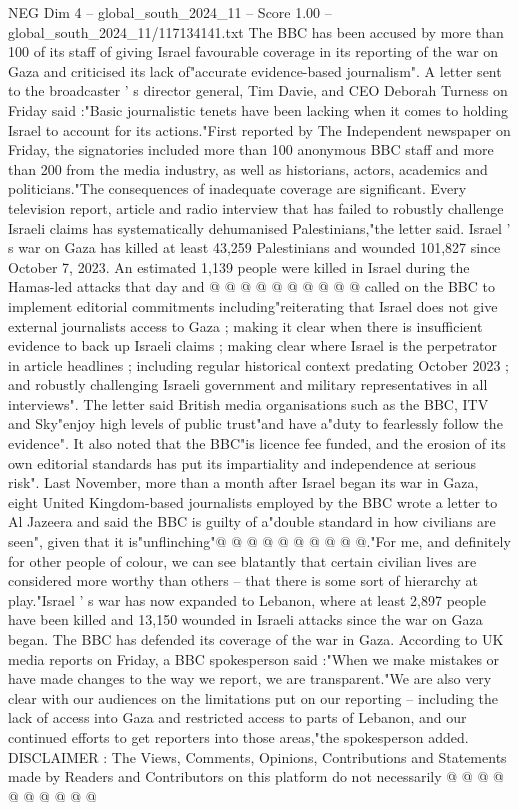 \begin{textsample}{NEG Dim 4 – global\_south\_2024\_11 – Score 1.00 – global\_south\_2024\_11/117134141.txt}  \label{ex:f4_neg_205}
The BBC has been accused by more than 100 of its staff of giving Israel favourable coverage in its reporting of the war on Gaza and criticised its lack of"accurate evidence-based journalism".
A letter sent to the broadcaster ' s director general, Tim Davie, and CEO Deborah Turness on Friday said :"Basic journalistic tenets have been lacking when it comes to holding Israel to account for its actions."First reported by The Independent newspaper on Friday, the signatories included more than 100 anonymous BBC staff and more than 200 from the media industry, as well as historians, actors, academics and politicians."The consequences of inadequate coverage are significant.
Every television report, article and radio interview that has failed to robustly challenge Israeli claims has systematically dehumanised Palestinians,"the letter said.
Israel ' s war on Gaza has killed at least 43,259 Palestinians and wounded 101,827 since October 7, 2023.
An estimated 1,139 people were killed in Israel during the Hamas-led attacks that day and @ @ @ @ @ @ @ @ @ @ called on the BBC to implement editorial commitments including"reiterating that Israel does not give external journalists access to Gaza ; making it clear when there is insufficient evidence to back up Israeli claims ; making clear where Israel is the perpetrator in article headlines ; including regular historical context predating October 2023 ; and robustly challenging Israeli government and military representatives in all interviews".
The letter said British media organisations such as the BBC, ITV and Sky"enjoy high levels of public trust"and have a"duty to fearlessly follow the evidence".
It also noted that the BBC"is licence fee funded, and the erosion of its own editorial standards has put its impartiality and independence at serious risk".
Last November, more than a month after Israel began its war in Gaza, eight United Kingdom-based journalists employed by the BBC wrote a letter to Al Jazeera and said the BBC is guilty of a"double standard in how civilians are seen", given that it is"unflinching"@ @ @ @ @ @ @ @ @ @."For me, and definitely for other people of colour, we can see blatantly that certain civilian lives are considered more worthy than others -- that there is some sort of hierarchy at play."Israel ' s war has now expanded to Lebanon, where at least 2,897 people have been killed and 13,150 wounded in Israeli attacks since the war on Gaza began.
The BBC has defended its coverage of the war in Gaza.
According to UK media reports on Friday, a BBC spokesperson said :"When we make mistakes or have made changes to the way we report, we are transparent."We are also very clear with our audiences on the limitations put on our reporting -- including the lack of access into Gaza and restricted access to parts of Lebanon, and our continued efforts to get reporters into those areas,"the spokesperson added.
DISCLAIMER : The Views, Comments, Opinions, Contributions and Statements made by Readers and Contributors on this platform do not necessarily @ @ @ @ @ @ @ @ @ @

\end{textsample}
